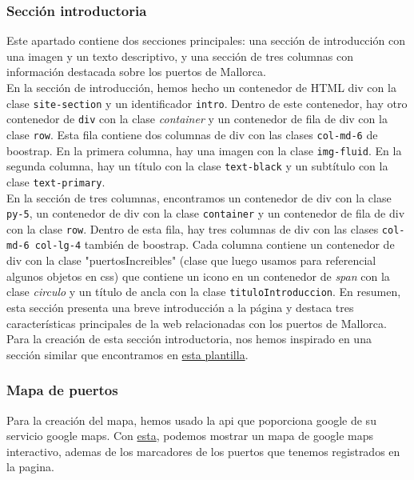 \documentclass{article}
\begin{document}
\subsubsection{Sección introductoria}
Este apartado contiene dos secciones principales: una sección de introducción con una imagen y un texto descriptivo, y una sección de tres columnas con información destacada sobre los puertos de Mallorca.\\

\noindent En la sección de introducción, hemos hecho un contenedor de HTML div con la clase \texttt{site-section} y un identificador \texttt{intro}. Dentro de este contenedor, hay otro contenedor de \texttt{div} con la clase \textit{container} y un contenedor de fila de div con la clase \texttt{row}. Esta fila contiene dos columnas de div con las clases \texttt{col-md-6} de boostrap. En la primera columna, hay una imagen con la clase \texttt{img-fluid}. En la segunda columna, hay un título con la clase \texttt{text-black} y un subtítulo con la clase \texttt{text-primary}.\\

\noindent En la sección de tres columnas, encontramos un contenedor de div con la clase \texttt{py-5}, un contenedor de div con la clase \texttt{container} y un contenedor de fila de div con la clase \texttt{row}. Dentro de esta fila, hay tres columnas de div con las clases \texttt{col-md-6 col-lg-4} también de boostrap. Cada columna contiene un contenedor de div con la clase "puertosIncreibles" (clase que luego usamos para referencial algunos objetos en css) que contiene un icono en un contenedor de \textit{span} con la clase \textit{circulo} y un título de ancla con la clase \texttt{tituloIntroduccion}. En resumen, esta sección presenta una breve introducción a la página y destaca tres características principales de la web relacionadas con los puertos de Mallorca.\\

\noindent Para la creación de esta sección introductoria, nos hemos inspirado en una sección similar que encontramos en \href{https://themewagon.github.io/waterboat/}{esta plantilla}.

\subsubsection{Mapa de puertos}
Para la creación del mapa, hemos usado la api que poporciona google de su servicio google maps. Con \href{https://developers.google.com/maps?hl=es%2F%3Fq%3Dapis%20google}{esta}, podemos mostrar un mapa de google maps interactivo, ademas de los marcadores de los puertos que tenemos registrados en la pagina.
\end{document}
